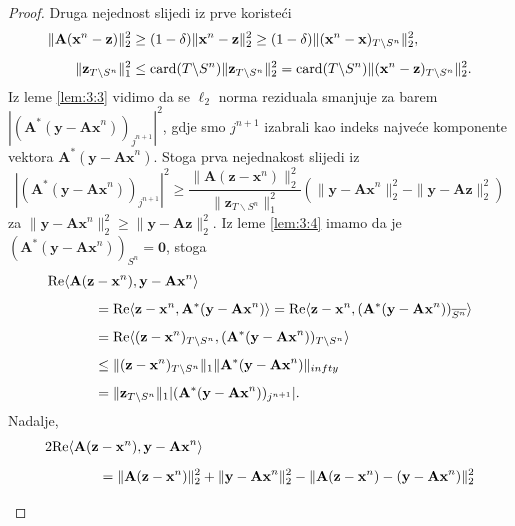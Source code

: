 \documentclass[a4paper,twoside,12pt]{memoir} %
\newcommand{\vect}[1]{\mathbf{#1}}
\renewcommand{\vec}{\vect}
\newcommand{\card}{\text{\normalfont{card}}}
\newcommand{\norm}[1]{\|{#1}\|}
\renewcommand{\Re}{\text{\normalfont{Re}}}
\begin{document}
\begin{proof}
    Druga nejednost slijedi iz prve koriste\'ci
    \begin{align*}
        \norm{\vec A(\vec x^n - \vec z)}_2^2 &\geq (1-\delta)\norm{\vec x^n - \vec z}_2^2 \geq (1-\delta)\norm{(\vec x^n - \vec x)_{T \backslash S^n}}_2^2,\\[0.5em]
        \norm{\vec z_{T \backslash S^n}}_1^2 &\leq \card(T \backslash S^n) \norm{\vec z_{T \backslash S^n}}_2^2 = \card(T \backslash S^n) \norm{(\vec x^n - \vec z)_{T \backslash S^n}}_2^2.
    \end{align*}
    Iz leme \ref{lem:3:3} vidimo da se $\ell_2$ norma reziduala smanjuje za barem $|(\vec A^*(\vec y - \vec {Ax}^n))_{j^{n+1}}|^2$, gdje smo $j^{n+1}$ izabrali kao indeks najve\'ce komponente vektora $\vec A^*(\vec y - \vec{Ax}^n)$. Stoga prva nejednakost slijedi iz
    \begin{equation}\label{6:41}
        |(\vec A^*(\vec y - \vec{Ax}^n))_{j^{n+1}}|^2 \geq \frac{\norm{\vec A (\vec z - \vec x^n)}_2^2}{\norm{\vec z_{T \backslash S^n}}_1^2} (\norm{\vec y - \vec{Ax}^n}_2^2 - \norm{\vec y - \vec{Az}}_2^2)
    \end{equation}
    za $\norm{\vec y - \vec{Ax}^n}_2^2 \geq \norm{\vec y  - \vec{Az}}_2^2$. Iz leme \ref{lem:3:4} imamo da je $(\vec A^*(\vec y - \vec{Ax}^n))_{S^n} = \vec 0$, stoga
    \begin{align}
        \Re \langle \vec A(\vec z &- \vec x^n),  \vec y - \vec{Ax}^n \rangle \nonumber \\[0.5em]
        & = \Re \langle \vec z - \vec x^n, \vec A^*(\vec y - \vec{Ax}^n)\rangle = \Re \langle \vec z - \vec x^n, (\vec A^*(\vec y - \vec{Ax}^n))_{\overline{S^n}}\rangle \nonumber \\[0.5em]
        & = \Re \langle (\vec z - \vec x^n)_{T \backslash S^n} , (\vec A^*(\vec y - \vec{Ax}^n))_{T \backslash S^n}\rangle \nonumber \\[0.5em]
        & \leq \norm{(\vec z - \vec x^n)_{T \backslash S^n}}_1 \norm{\vec A^*(\vec y - \vec {Ax}^n)}_{infty} \nonumber \\[0.5em]
        & = \norm{\vec z_{T \backslash S^n}}_1 |(\vec A^*(\vec y - \vec {Ax}^n))_{j^{n+1}}|. \label{6:42}
    \end{align}
    Nadalje, 
    \begin{align}
        2 \Re \langle \vec A(\vec z &- \vec x^n), \vec y - \vec{Ax}^n \rangle \nonumber \\[0.5em]
        & = \norm{\vec A(\vec z - \vec x^n)}_2^2 + \norm{\vec y - \vec{Ax}^n}_2^2 - \norm{\vec A(\vec z - \vec x^n) - (\vec y - \vec{Ax}^n)}_2^2 \nonumber \\[0.5em]

\end{align}
\end{proof}
\end{document}
